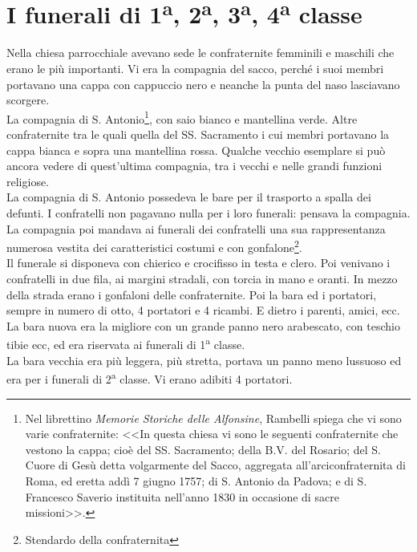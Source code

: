 
\chapter{I funerali di 1\textsuperscript{a}, 2\textsuperscript{a}, 3\textsuperscript{a}, 4\textsuperscript{a} classe}
Nella chiesa parrocchiale avevano sede le confraternite femminili e maschili che erano le più importanti. Vi era la compagnia del sacco, perché i suoi membri portavano una cappa con cappuccio nero e neanche la punta del naso lasciavano scorgere. \\
\indent La compagnia di S. Antonio\footnote{Nel librettino \textit{Memorie Storiche delle Alfonsine}, Rambelli spiega che vi sono varie confraternite: <<In questa chiesa vi sono le seguenti confraternite che vestono la cappa; cioè del SS. Sacramento; della B.V. del Rosario; del S. Cuore di Gesù detta volgarmente del Sacco, aggregata all'arciconfraternita di Roma, ed eretta addì 7 giugno 1757; di S. Antonio da Padova; e di S. Francesco Saverio instituita nell'anno 1830 in occasione di sacre missioni>>.}, con saio bianco e mantellina verde. Altre confraternite tra le quali quella del SS. Sacramento i cui membri portavano la cappa bianca e sopra una mantellina rossa. Qualche vecchio esemplare si può ancora vedere di quest'ultima compagnia, tra i vecchi e nelle grandi funzioni religiose.\\
\indent La compagnia di S. Antonio possedeva le bare per il trasporto a spalla dei defunti. I confratelli non pagavano nulla per i loro funerali: pensava la compagnia. La compagnia poi mandava ai funerali dei confratelli una sua rappresentanza numerosa vestita dei caratteristici costumi e con gonfalone\footnote{Stendardo della confraternita}.\\
\indent Il funerale si disponeva con chierico e crocifisso in testa e clero. Poi venivano i confratelli in due fila, ai margini stradali, con torcia in mano e oranti. In mezzo della strada erano i gonfaloni delle confraternite. Poi la bara ed i portatori, sempre in numero di otto, 4 portatori e 4 ricambi. E dietro i parenti, amici, ecc. La bara nuova era la migliore con un grande panno nero arabescato, con teschio tibie ecc, ed era riservata ai funerali di 1\textsuperscript{a} classe. \\
\indent La bara vecchia era più leggera, più stretta, portava un panno meno lussuoso ed era per i funerali di 2\textsuperscript{a} classe. Vi erano adibiti 4 portatori.\\
